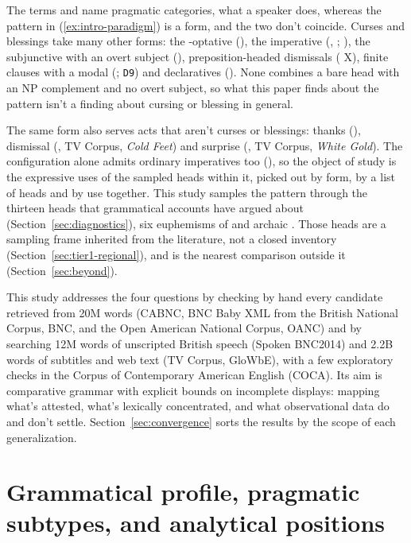 \documentclass[12pt]{article}
\begin{document}
The terms  and  name pragmatic categories, what a speaker does, whereas the pattern in (\ref{ex:intro-paradigm}) is a form, and the two don't coincide. Curses and blessings take many other forms: the -optative (), the imperative (, ; \citealp[32]{ljung2011}), the subjunctive with an overt subject (), preposition-headed dismissals ( X), finite clauses with a modal (; \texttt{D9}) and declaratives (). None combines a bare head with an NP complement and no overt subject, so what this paper finds about the pattern isn't a finding about cursing or blessing in general.

The same form also serves acts that aren't curses or blessings: thanks (), dismissal (, TV Corpus, \emph{Cold Feet}) and surprise (, TV Corpus, \emph{White Gold}). The configuration alone admits ordinary imperatives too (), so the object of study is the expressive uses of the sampled heads within it, picked out by form, by a list of heads and by use together. This study samples the pattern through the thirteen heads that grammatical accounts have argued about (Section~\ref{sec:diagnostics}), six euphemisms of  and archaic . Those heads are a sampling frame inherited from the literature, not a closed inventory (Section~\ref{sec:tier1-regional}), and  is the nearest comparison outside it (Section~\ref{sec:beyond}).

This study addresses the four questions by checking by hand every candidate retrieved from 20M words (CABNC, BNC Baby XML from the British National Corpus, BNC, and the Open American National Corpus, OANC) and by searching 12M words of unscripted British speech (Spoken BNC2014) and 2.2B words of subtitles and web text (TV Corpus, GloWbE), with a few exploratory checks in the Corpus of Contemporary American English (COCA). Its aim is comparative grammar with explicit bounds on incomplete displays: mapping what's attested, what's lexically concentrated, and what observational data do and don't settle. Section~\ref{sec:convergence} sorts the results by the scope of each generalization.

\section{Grammatical profile, pragmatic subtypes, and analytical positions}
\label{sec:frameworks}
\end{document}
